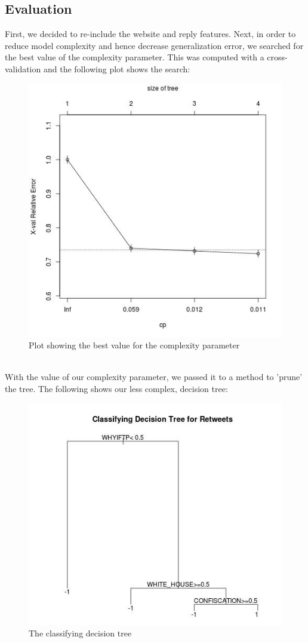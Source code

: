 \documentclass[12pt]{article}
\begin{document}
\subsection{Evaluation}
First, we decided to re-include the website and reply features. Next, in order to reduce model complexity and hence decrease generalization error, we searched for the best value of the complexity parameter. This was computed with a cross-validation and the following plot shows the search: \\
\begin{figure}[h]
\centering
\includegraphics[width=12cm]{plotcp.jpeg}
\caption{Plot showing the best value for the complexity parameter}
\label{fig:dtree}
\end{figure}\\
With the value of our complexity parameter, we passed it to a method to 'prune' the tree. The following shows our less complex, decision tree:
\newpage
\begin{figure}[h]
\centering
\includegraphics[width=12cm]{dtree.jpeg}
\caption{The classifying decision tree}
\label{fig:cp}
\end{figure}
\end{document}

